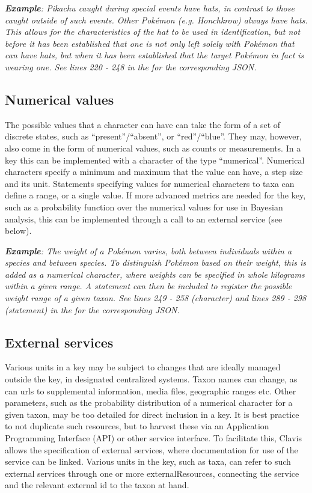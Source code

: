 \documentclass[10pt,letterpaper]{article}
\begin{document}
\textit{\textbf{Example}: Pikachu caught during special events have hats, in contrast to those caught outside of such events. Other Pokémon (e.g. Honchkrow) always have hats. This allows for the characteristics of the hat to be used in identification, but not before it has been established that one is not only left solely with Pokémon that can have hats, but when it has been established that the target Pokémon in fact is wearing one. See lines 220 - 248 in the  for the corresponding JSON.}
\subsection*{
Numerical values
}
The possible values that a character can have can take the form of a set of discrete states, such as ``present''/``absent'', or ``red''/``blue''. They may, however, also come in the form of numerical values, such as counts or measurements. In a key this can be implemented with a character of the type ``numerical''. Numerical characters specify a minimum and maximum that the value can have, a step size and its unit. Statements specifying values for numerical characters to taxa can define a range, or a single value. If more advanced metrics are needed for the key, such as a probability function over the numerical values for use in Bayesian analysis, this can be implemented through a call to an external service (see below).

\textit{\textbf{Example}: The weight of a Pokémon varies, both between individuals within a species and between species. To distinguish Pokémon based on their weight, this is added as a numerical character, where weights can be specified in whole kilograms within a given range. A statement can then be included to register the possible weight range of a given taxon. See lines 249 - 258 (character) and lines 289 - 298 (statement) in the  for the corresponding JSON.}
\subsection*{
External services
}
Various units in a key may be subject to changes that are ideally managed outside the key, in designated centralized systems. Taxon names can change, as can urls to supplemental information, media files, geographic ranges etc. Other parameters, such as the probability distribution of a numerical character for a given taxon, may be too detailed for direct inclusion in a key. It is best practice to not duplicate such resources, but to harvest these via an Application Programming Interface (API) or other service interface. To facilitate this, Clavis allows the specification of external services, where documentation for use of the service can be linked. Various units in the key, such as taxa, can refer to such external services through one or more externalResources, connecting the service and the relevant external id to the taxon at hand.
\end{document}
